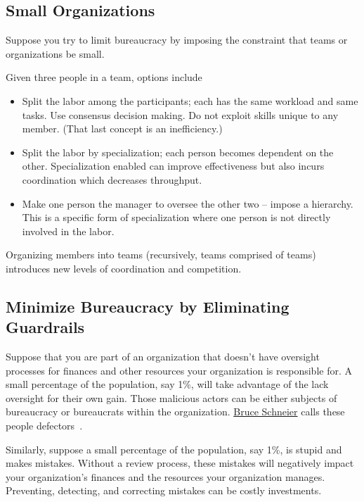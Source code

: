 \subsection*{Small Organizations}

Suppose you try to limit bureaucracy by imposing the constraint that teams or organizations be small.

Given three people in a team, options include
\begin{itemize}
    \item Split the labor among the participants; each has the same workload and same tasks. Use consensus decision making. Do not exploit skills unique to any member. (That last concept is an inefficiency.)
    \item Split the labor by specialization; each person becomes dependent on the other. Specialization enabled can improve effectiveness but also incurs coordination which decreases throughput.
    \item Make one person the manager to oversee the other two -- impose a hierarchy. This is a specific form of specialization where one person is not directly involved in the labor.
\end{itemize}
Organizing members into teams (recursively, teams comprised of teams) introduces new levels of coordination and competition.

\subsection*{Minimize Bureaucracy by Eliminating Guardrails}

Suppose that you are part of an organization that doesn't have oversight processes for finances and other resources your organization is responsible for. A small percentage of the population, say 1\%, will take advantage of the lack oversight for their own gain. Those malicious actors can be either subjects of bureaucracy or bureaucrats within the organization. 
\href{https://en.wikipedia.org/wiki/Bruce_Schneier}{Bruce Schneier}
calls these people defectors~\cite{2012_Schneier}.

Similarly, suppose a small percentage of the population, say 1\%, is stupid and makes mistakes. Without a review process, these mistakes will negatively impact your organization's finances and the resources your organization manages. Preventing, detecting, and correcting mistakes can be costly investments. 

